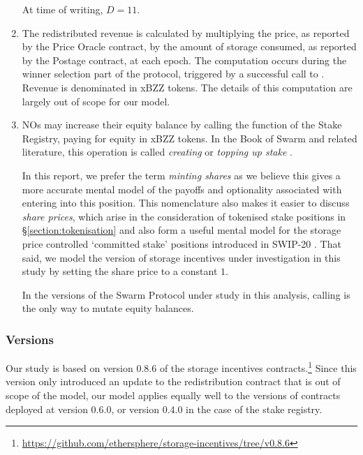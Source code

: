 \begin{enumerate}
    At time of writing, $D=11$.



  \item 
    The redistributed revenue is calculated by multiplying the price, as reported by the Price Oracle contract, by the amount of storage consumed, as reported by the Postage contract, at each epoch.
    The computation occurs during the winner selection part of the protocol, triggered by a successful call to .
    Revenue is denominated in xBZZ tokens.
    The details of this computation are largely out of scope for our model.
  
  \item 
    NOs may increase their equity balance by calling the  function of the Stake Registry, paying for equity in xBZZ tokens.
    In the Book of Swarm and related literature, this operation is called \emph{creating} or \emph{topping up stake} \cite[\S3.4.3]{book-of-swarm}.
    
    In this report, we prefer the term \emph{minting shares} as we believe this gives a more accurate mental model of the payoffs and optionality associated with entering into this position.
    This nomenclature also makes it easier to discuss \emph{share prices}, which arise in the consideration of tokenised stake positions in \S\ref{section:tokenisation} and also form a useful mental model for the storage price controlled `committed stake' positions introduced in SWIP-20 \cite{swip-20}.
    That said, we model the version of storage incentives under investigation in this study by setting the share price to a constant $1$.

    In the versions of the Swarm Protocol under study in this analysis, calling  is the only way to mutate equity balances.

\end{enumerate}

\subsubsection{Versions}
\label{section:versions}

Our study is based on version 0.8.6 of the storage incentives contracts.\footnote{\url{https://github.com/ethersphere/storage-incentives/tree/v0.8.6}}
%
Since this version only introduced an update to the redistribution contract that is out of scope of the model, our model applies equally well to the versions of contracts deployed at version 0.6.0, or version 0.4.0 in the case of the stake registry.



